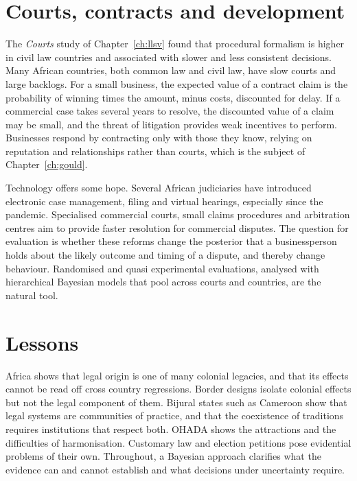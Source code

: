 \section{Courts, contracts and development}

The \emph{Courts} study of Chapter~\ref{ch:llsv} \citep{djankov2003} found that procedural formalism is higher in civil law countries and associated with slower and less consistent decisions. Many African countries, both common law and civil law, have slow courts and large backlogs. For a small business, the expected value of a contract claim is the probability of winning times the amount, minus costs, discounted for delay. If a commercial case takes several years to resolve, the discounted value of a claim may be small, and the threat of litigation provides weak incentives to perform. Businesses respond by contracting only with those they know, relying on reputation and relationships rather than courts, which is the subject of Chapter~\ref{ch:gould}.

Technology offers some hope. Several African judiciaries have introduced electronic case management, filing and virtual hearings, especially since the pandemic. Specialised commercial courts, small claims procedures and arbitration centres aim to provide faster resolution for commercial disputes. The question for evaluation is whether these reforms change the posterior that a businessperson holds about the likely outcome and timing of a dispute, and thereby change behaviour. Randomised and quasi experimental evaluations, analysed with hierarchical Bayesian models that pool across courts and countries, are the natural tool.

\section{Lessons}

Africa shows that legal origin is one of many colonial legacies, and that its effects cannot be read off cross country regressions. Border designs isolate colonial effects but not the legal component of them. Bijural states such as Cameroon show that legal systems are communities of practice, and that the coexistence of traditions requires institutions that respect both. OHADA shows the attractions and the difficulties of harmonisation. Customary law and election petitions pose evidential problems of their own. Throughout, a Bayesian approach clarifies what the evidence can and cannot establish and what decisions under uncertainty require.


